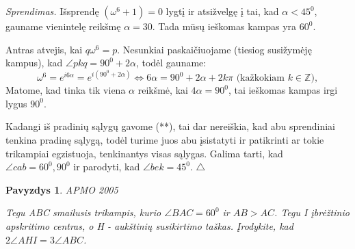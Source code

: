 \documentclass[11pt,a4paper,twoside]{book}
\newenvironment{sprendimas}{\noindent \textit{Sprendimas.}}{\hfill $\triangle$}
\newcounter{foo}[subsection]
\newtheorem{pavnr}[foo]{Pavyzdys}
\theoremstyle{definition} \newtheorem*{api}{Apibrėžimas}
\theoremstyle{remark} \newtheorem*{pastaba}{Pastaba}
\begin{document}
\begin{sprendimas}
Išsprendę $(\omega^6+1)=0$ lygtį ir atsižvelgę į tai, kad $ \alpha < 45^0$, gauname vienintelę reikšmę $\alpha = 30$. Tada mūsų ieškomas kampas yra $60^0$.

Antras atvejis, kai $q\omega^6 =p$. Nesunkiai paskaičiuojame (tiesiog susižymėję kampus), kad $\angle pkq=90^0 +2\alpha$, todėl gauname:
\begin{equation*}
\omega^6=e^{i6\alpha}=e^{i(90^0 +2\alpha)} \Leftrightarrow 6\alpha=90^0 +2\alpha +2k\pi \text{ (kažkokiam } k\in \mathbb{Z}),
\end{equation*}
Matome, kad tinka tik viena $\alpha$ reikšmė, kai $4\alpha=90^0$, tai ieškomas kampas irgi lygus $90^0$.

Kadangi iš pradinių sąlygų gavome (**), tai dar nereiškia, kad abu sprendiniai tenkina pradinę sąlygą, todėl turime juos abu įsistatyti ir patikrinti ar tokie trikampiai egzistuoja, tenkinantys visas sąlygas. Galima tarti, kad $\angle cab= 60^0,90^0$ ir parodyti, kad $\angle bek =45^0$.
\end{sprendimas}
\begin{pavnr}
 APMO 2005

Tegu ABC smailusis trikampis, kurio $\angle BAC = 60^0$ ir $AB>AC$. Tegu I įbrėžtinio apskritimo centras, o H - aukštinių susikirtimo taškas. Įrodykite, kad $2\angle AHI=3\angle ABC$.
\end{pavnr}
\end{document}
